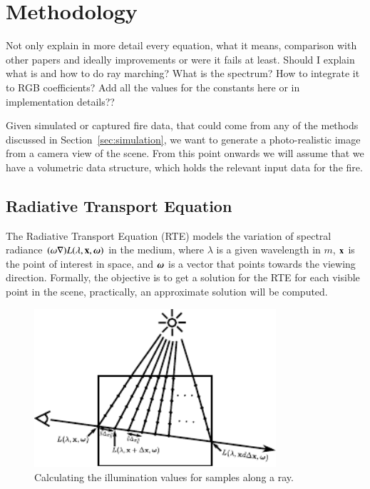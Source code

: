 \chapter{Methodology}
\label{ch:methodology}

Not only explain in more detail every equation, what it means, comparison with other papers and ideally improvements or were it fails at least.
Should I explain what is and how to do ray marching? What is the spectrum? How to integrate it to RGB coefficients?
Add all the values for the constants here or in implementation details??

Given simulated or captured fire data, that could come from any of the methods discussed in Section~\ref{sec:simulation}, we want to generate a photo-realistic image from a camera view of the scene.
From this point onwards we will assume that we have a volumetric data structure, which holds the relevant input data for the fire.

\section{Radiative Transport Equation}
\label{sec:radiative_transport_equation}

The Radiative Transport Equation (RTE) \cite{Howell:2002} models the variation of spectral radiance $(\omega \nabla) L(\lambda, \mathbf{x}, \boldsymbol{\omega})$ in the medium, where $\lambda$ is a given wavelength in $m$, $\mathbf{x}$ is the point of interest in space, and $\boldsymbol{\omega}$ is a vector that points towards the viewing direction.
Formally, the objective is to get a solution for the RTE for each visible point in the scene, practically, an approximate solution will be computed.

\begin{figure}[htbp!]
	\centering
	\includegraphics[width=0.8\textwidth]{img/ray_marching}
	\caption{Calculating the illumination values for samples along a ray.}
	\label{fig:ray_marching1}
\end{figure}

